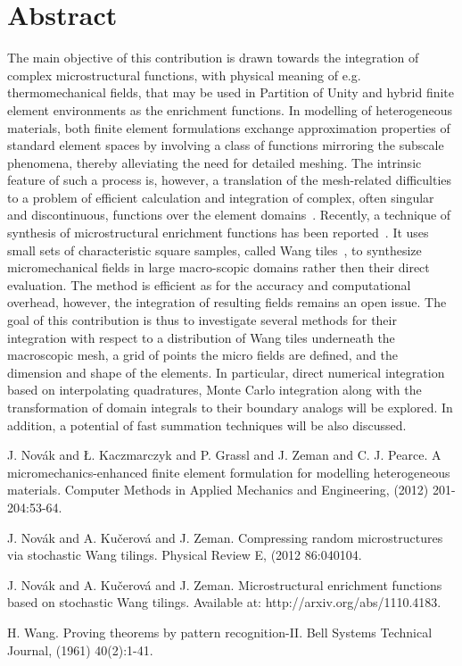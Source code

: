 \documentclass[article,A4,11pt]{llncs}%
\begin{document}
\section*{Abstract}
The main objective of this contribution is drawn towards the integration of complex microstructural functions, with physical meaning of e.g. thermomechanical fields, that may be used in Partition of Unity and hybrid finite element environments as the enrichment functions. In modelling of heterogeneous materials, both finite element formulations exchange approximation properties of standard element spaces by involving a class of functions mirroring the subscale phenomena, thereby alleviating the need for detailed meshing. The intrinsic feature of such a process is, however, a translation of the mesh-related difficulties to a problem of efficient calculation and integration of complex, often singular and discontinuous, functions over the element domains~\cite{Novak:CMAME:2012}. Recently, a technique of synthesis of microstructural enrichment functions has been reported~\cite{Novak:PRE:2012,Novak:MSMSE:2012}. It uses small sets of characteristic square samples, called Wang tiles~\cite{Wang:BSTJ:1961}, to synthesize micromechanical fields in large macro-scopic domains rather then their direct evaluation. The method is efficient as for the accuracy and computational overhead, however, the integration of resulting fields remains an open issue. The goal of this contribution is thus to investigate several methods for their integration with respect to a distribution of Wang tiles underneath the macroscopic mesh, a grid of points the micro fields are defined, and the dimension and shape of the elements. In particular, direct numerical integration based on interpolating quadratures, Monte Carlo integration along with the transformation of domain integrals to their boundary analogs will be explored. In addition, a potential of fast summation techniques will be also discussed.


\begin{thebibliography}{10}
{\sc J. Nov\'{a}k and \L. Kaczmarczyk and P. Grassl and J. Zeman and C. J. Pearce}. {A micromechanics-enhanced finite element formulation for modelling heterogeneous materials}. Computer Methods in Applied Mechanics and Engineering, (2012) 201-204:53-64.

{\sc J. Nov\'{a}k and A. Ku\v{c}erov\'{a} and J. Zeman}. {Compressing random microstructures via stochastic Wang tilings}. Physical Review E, (2012 86:040104.

{\sc J. Nov\'{a}k and A. Ku\v{c}erov\'{a} and J. Zeman}. {Microstructural enrichment functions based on stochastic Wang tilings}. Available at: http://arxiv.org/abs/1110.4183.

{\sc H. Wang}. {Proving theorems by pattern recognition-II}. Bell Systems Technical Journal, (1961) 40(2):1-41.
\end{thebibliography}
\end{document}
